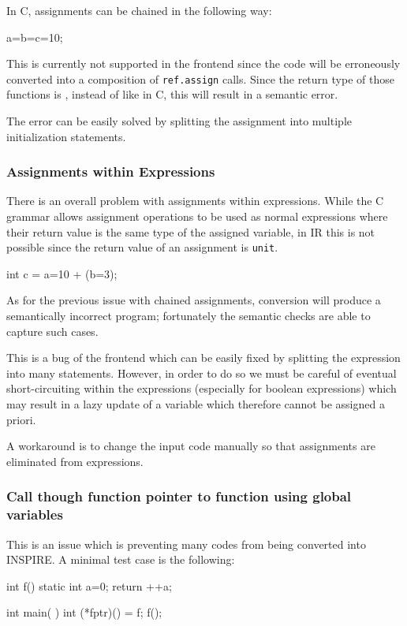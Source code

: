 In C, assignments can be chained in the following way:
\begin{srcCode}
a=b=c=10;
\end{srcCode}
This is currently not supported in the frontend since the code will be
erroneously converted into a composition of {\tt ref.assign} calls. Since the
return type of those functions is , instead of  like in C,
this will result in a semantic error. 

The error can be easily solved by splitting the assignment into multiple
initialization statements. 

\subsubsection{Assignments within Expressions}

There is an overall problem with assignments within expressions. While the C
grammar allows assignment operations to be used as normal expressions where
their return value is the same type of the assigned variable, in IR this is not
possible since the return value of an assignment is {\tt unit}. 

\begin{srcCode}
int c = a=10 + (b=3);
\end{srcCode}

As for the previous issue with chained assignments, conversion will produce a
semantically incorrect program; fortunately the semantic checks are able to
capture such cases. 

This is a bug of the frontend which can be easily fixed by splitting the
expression into many statements. However, in order to do so we must be careful
of eventual short-circuiting within the expressions (especially for boolean
expressions) which may result in a lazy update of a variable which therefore
cannot be assigned a priori. 

A workaround is to change the input code manually so that assignments are
eliminated from expressions.

\subsubsection{Call though function pointer to function using global variables}

This is an issue which is preventing many codes from being converted into
INSPIRE. A minimal test case is the following:

\begin{srcCode}
int f() {
	static int a=0;
	return ++a;
}

int main( ) {
	int (*fptr)() = f;
	f();
}
\end{srcCode}

